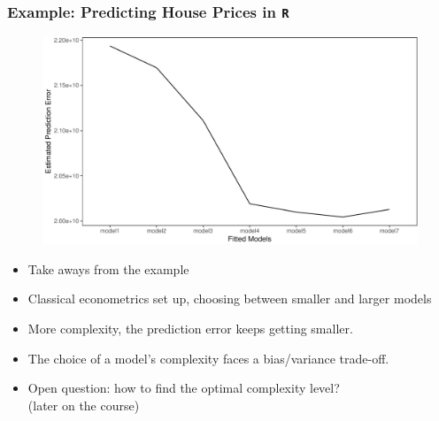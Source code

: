 \documentclass[
  shownotes,
  xcolor={svgnames},
  hyperref={colorlinks,citecolor=DarkBlue,linkcolor=DarkRed,urlcolor=DarkBlue}
  ]{beamer}
\begin{document}
\begin{frame}[fragile]
\frametitle{Example: Predicting House Prices in \texttt{R}}

   \begin{figure}[H] \centering
            \captionsetup{justification=centering}  
            \includegraphics[scale=.4]{figures/mse_plot_ch3-1.pdf}
    \end{figure}

\end{frame}
\begin{frame}[fragile]


\begin{itemize}
  \item Take aways from the example
  \bigskip
  \item Classical econometrics set up, choosing between smaller and larger models
  \bigskip
  \item More complexity, the prediction error keeps getting smaller.
  \bigskip
  \item The choice of a model's complexity faces a bias/variance trade-off.  
  \bigskip
  \item Open question: how to find the optimal complexity level? \\ {\tiny (later on the course)}

\end{itemize}


\end{frame}

\end{document}
